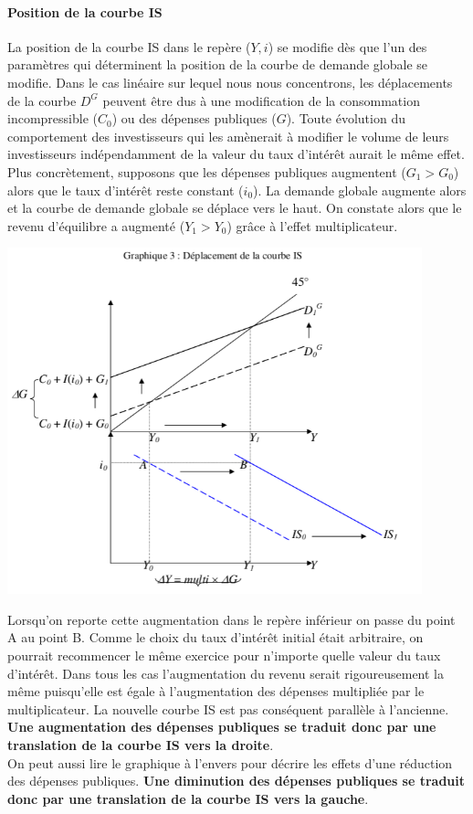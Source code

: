 \documentclass[10pt]{book}
\begin{document}
\paragraph{Position de la courbe IS}
La position de la courbe IS dans le repère ($Y,i$) se modifie dès que l'un des paramètres qui déterminent la position de la courbe de demande globale se modifie. Dans le cas linéaire sur lequel nous nous concentrons, les déplacements de la courbe $D^G$ peuvent être dus à une modification de la consommation incompressible ($C_0$) ou des dépenses publiques ($G$). Toute évolution du comportement des investisseurs qui les amènerait à modifier le volume de leurs investisseurs indépendamment de la valeur du taux d'intérêt aurait le même effet. \\
Plus concrètement, supposons que les dépenses publiques augmentent ($G_1 > G_0$) alors que le taux d'intérêt reste constant ($i_0$). La demande globale augmente alors et la courbe de demande globale se déplace vers le haut. On constate alors que le revenu d'équilibre a augmenté ($Y_1 > Y_0$) grâce à l'effet multiplicateur.
\begin{center}
  \includegraphics[width=12cm]{graph25.png}
\end{center}
Lorsqu'on reporte cette augmentation dans le repère inférieur on passe du point A au point B. Comme le choix du taux d'intérêt initial était arbitraire, on pourrait recommencer le même exercice pour n'importe quelle valeur du taux d'intérêt. Dans tous les cas l'augmentation du revenu serait rigoureusement la même puisqu'elle est égale à l'augmentation des dépenses multipliée par le multiplicateur. La nouvelle courbe IS est pas conséquent parallèle à l'ancienne. \textbf{Une augmentation des dépenses publiques se traduit donc par une translation de la courbe IS vers la droite}. \\
On peut aussi lire le graphique à l'envers pour décrire les effets d'une réduction des dépenses publiques. \textbf{Une diminution des dépenses publiques se traduit donc par une translation de la courbe IS vers la gauche}.
\end{document}
